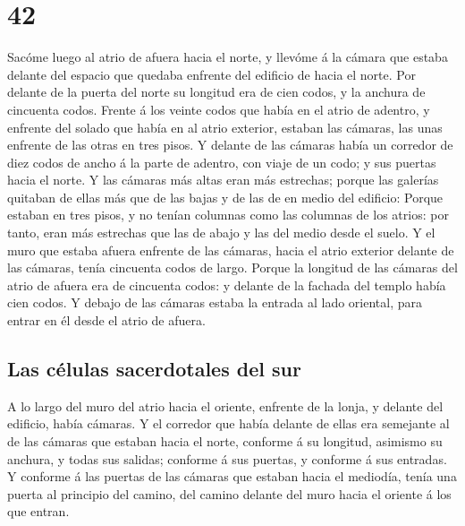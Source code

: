 \hypertarget{section-41}{%
\section{42}\label{section-41}}

 Sacóme luego al atrio de afuera hacia el norte, y llevóme
á la cámara que estaba delante del espacio que quedaba enfrente del
edificio de hacia el norte.  Por delante de la puerta del
norte su longitud era de cien codos, y la anchura de cincuenta codos.
 Frente á los veinte codos que había en el atrio de
adentro, y enfrente del solado que había en al atrio exterior, estaban
las cámaras, las unas enfrente de las otras en tres pisos.
 Y delante de las cámaras había un corredor de diez codos
de ancho á la parte de adentro, con viaje de un codo; y sus puertas
hacia el norte.  Y las cámaras más altas eran más
estrechas; porque las galerías quitaban de ellas más que de las bajas y
de las de en medio del edificio:  Porque estaban en tres
pisos, y no tenían columnas como las columnas de los atrios: por tanto,
eran más estrechas que las de abajo y las del medio desde el suelo.
 Y el muro que estaba afuera enfrente de las cámaras,
hacia el atrio exterior delante de las cámaras, tenía cincuenta codos de
largo.  Porque la longitud de las cámaras del atrio de
afuera era de cincuenta codos: y delante de la fachada del templo había
cien codos.  Y debajo de las cámaras estaba la entrada al
lado oriental, para entrar en él desde el atrio de afuera.

\hypertarget{las-cuxe9lulas-sacerdotales-del-sur}{%
\subsection{Las células sacerdotales del
sur}\label{las-cuxe9lulas-sacerdotales-del-sur}}

 A lo largo del muro del atrio hacia el oriente, enfrente
de la lonja, y delante del edificio, había cámaras.  Y el
corredor que había delante de ellas era semejante al de las cámaras que
estaban hacia el norte, conforme á su longitud, asimismo su anchura, y
todas sus salidas; conforme á sus puertas, y conforme á sus entradas.
 Y conforme á las puertas de las cámaras que estaban
hacia el mediodía, tenía una puerta al principio del camino, del camino
delante del muro hacia el oriente á los que entran.

